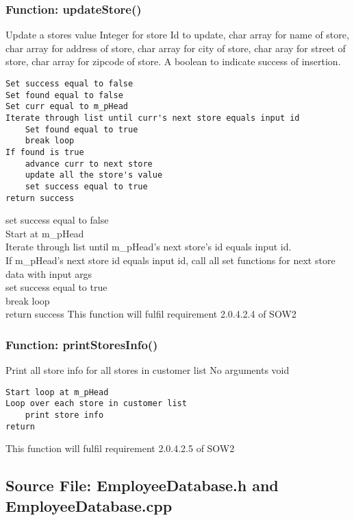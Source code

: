 \documentclass[12pt]{article}%
\newcounter{subsubsubsection}[subsubsection]
\begin{document}
\subsubsection{Function: updateStore()}
Update a stores value
Integer for store Id to update, char array for name of store, char array for address of store,
char array for city of store, char aray for street of store, char array for zipcode of store.
A boolean to indicate success of insertion.
\begin{verbatim}
Set success equal to false
Set found equal to false
Set curr equal to m_pHead
Iterate through list until curr's next store equals input id
    Set found equal to true
    break loop
If found is true
    advance curr to next store
    update all the store's value
    set success equal to true
return success
\end{verbatim}
set success equal to false \\
Start at m\_pHead \\
Iterate through list until m\_pHead's next store's id equals input id. \\
\quad If m\_pHead's next store id equals input id, call all set functions for next store data with input args \\
\quad \quad set success equal to true \\
\quad \quad break loop \\
return success
This function will fulfil requirement 2.0.4.2.4 of SOW2

\subsubsection{Function: printStoresInfo()}
Print all store info for all stores in customer list
No arguments
void
\begin{verbatim}
Start loop at m_pHead
Loop over each store in customer list
    print store info
return
\end{verbatim}
This function will fulfil requirement 2.0.4.2.5 of SOW2

\subsection{Source File: EmployeeDatabase.h and EmployeeDatabase.cpp}
\end{document}
